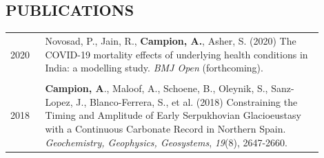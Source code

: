\documentclass[overlapped, 11pt]{res} %
\begin{document}
\begin{resume}
\section{PUBLICATIONS} 
\vspace{10pt}
\begin{tabular}{p{0.1\linewidth} p{0.8\linewidth}}
2020 & Novosad, P., Jain, R., \textbf{Campion, A.}, Asher, S. (2020) The COVID-19 mortality effects of underlying health conditions in India: a modelling study. \emph{BMJ Open} (forthcoming). \\
\\
2018 & \textbf{Campion, A}., Maloof, A., Schoene, B., Oleynik, S., Sanz-Lopez, J., Blanco-Ferrera, S., et al. (2018)  Constraining the Timing and Amplitude of Early Serpukhovian Glacioeustasy with a Continuous Carbonate Record in Northern Spain. \emph{Geochemistry, Geophysics, Geosystems}, \emph{19}(8), 2647-2660. \\

\end{tabular}


 

\end{resume}
\end{document}
